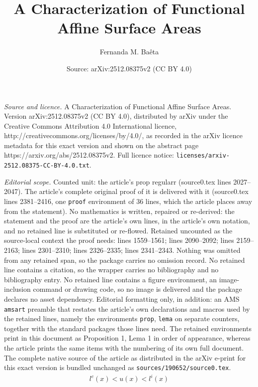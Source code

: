 \documentclass[10pt,a4paper]{amsart}
\title{A Characterization of Functional Affine Surface Areas}
\author{Fernanda M. Baêta}
\date{Source: arXiv:2512.08375v2 (CC BY 4.0)}
\begin{document}
\maketitle

\noindent\emph{Source and licence.} A Characterization of Functional Affine Surface Areas. Version arXiv:2512.08375v2 (CC BY 4.0), distributed by arXiv under the Creative Commons Attribution 4.0 International licence, http://creativecommons.org/licenses/by/4.0/, as recorded in the arXiv licence metadata for this exact version and shown on the abstract page https://arxiv.org/abs/2512.08375v2. Full licence notice: \texttt{licenses/arxiv-2512.08375-CC-BY-4.0.txt}.\par\smallskip

\noindent\textit{Editorial scope.} Counted unit: the article's prop regularr (source0.tex lines 2027--2047). The article's complete original proof of it is delivered with it (source0.tex lines 2381--2416, one \texttt{proof} environment of 36 lines, which the article places away from the statement). No mathematics is written, repaired or re-derived: the statement and the proof are the article's own lines, in the article's own notation, and no retained line is substituted or re-flowed.  Retained uncounted as the source-local context the proof needs: lines 1559--1561; lines 2090--2092; lines 2159--2163; lines 2301--2310; lines 2326--2335; lines 2341--2343.  Nothing was omitted from any retained span, so the package carries no omission record.  No retained line contains a citation, so the wrapper carries no bibliography and no bibliography entry.  No retained line contains a figure environment, an image-inclusion command or drawing code, so no image is delivered and the package declares no asset dependency.  Editorial formatting only, in addition: an AMS \texttt{amsart} preamble that restates the article's own declarations and macros used by the retained lines, namely the environments \texttt{prop}, \texttt{lema} on separate counters, together with the standard packages those lines need.  The retained environments print in this document as Proposition 1, Lema 1 in order of appearance, whereas the article prints the same items with the numbering of its own full document.  The complete native source of the article as distributed in the arXiv e-print for this exact version is bundled unchanged as \texttt{sources/190652/source0.tex}.
\begin{align}\label{li_lc}
l^c(x)< u(x)< l^i(x)
\end{align}
\end{document}
